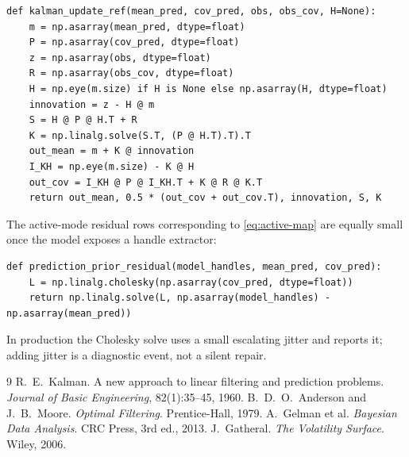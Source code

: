 \documentclass[11pt]{article}
\begin{document}
\begin{lstlisting}[caption={Covariance-form Kalman update with Joseph
covariance (verified against production; agreement stated above).}]
def kalman_update_ref(mean_pred, cov_pred, obs, obs_cov, H=None):
    m = np.asarray(mean_pred, dtype=float)
    P = np.asarray(cov_pred, dtype=float)
    z = np.asarray(obs, dtype=float)
    R = np.asarray(obs_cov, dtype=float)
    H = np.eye(m.size) if H is None else np.asarray(H, dtype=float)
    innovation = z - H @ m
    S = H @ P @ H.T + R
    K = np.linalg.solve(S.T, (P @ H.T).T).T
    out_mean = m + K @ innovation
    I_KH = np.eye(m.size) - K @ H
    out_cov = I_KH @ P @ I_KH.T + K @ R @ K.T
    return out_mean, 0.5 * (out_cov + out_cov.T), innovation, S, K
\end{lstlisting}

The active-mode residual rows corresponding to \cref{eq:active-map} are
equally small once the model exposes a handle extractor:

\begin{lstlisting}[caption={Whitened residual rows for the active MAP
prediction prior (distilled from
\texttt{volfit/calib/observation\_filter.py}).}]
def prediction_prior_residual(model_handles, mean_pred, cov_pred):
    L = np.linalg.cholesky(np.asarray(cov_pred, dtype=float))
    return np.linalg.solve(L, np.asarray(model_handles) - np.asarray(mean_pred))
\end{lstlisting}

In production the Cholesky solve uses a small escalating jitter and reports
it; adding jitter is a diagnostic event, not a silent repair.

\begin{thebibliography}{9}
 R.~E.~Kalman. A new approach to linear filtering and
prediction problems. \emph{Journal of Basic Engineering}, 82(1):35--45, 1960.
 B.~D.~O.~Anderson and J.~B.~Moore.
\emph{Optimal Filtering}. Prentice-Hall, 1979.
 A.~Gelman et al. \emph{Bayesian Data Analysis}. CRC
Press, 3rd ed., 2013.
 J.~Gatheral. \emph{The Volatility Surface}. Wiley,
2006.
\end{thebibliography}
\end{document}
